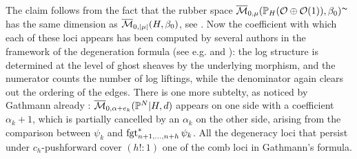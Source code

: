 \begin{rmk}
 \begin{center}
\end{center}
 
 The claim follows from the fact that the rubber space $\overline{\mathcal{M}}_{0,\mu}(\mathbb P_H(\mathcal{O}\oplus\mathcal{O}(1)),\beta_0)^\thicksim$ has the same dimension as $\overline{\mathcal{M}}_{0,\lvert\mu\rvert}(H,\beta_0)$, see \cite[\S 2.4]{GraberVakil}. Now the coefficient with which each of these loci appears has been computed by several authors in the framework of the degeneration formula (see e.g. \cite[Remark 6.3.1.2]{KimLog} and \cite[Equation (1.7)]{KLR}):  the log structure is determined at the level of ghost sheaves by the underlying morphism, and the numerator counts the number of log liftings, while the denominator again clears out the ordering of the edges. There is one more subtelty, as noticed by Gathmann already \cite[Corollary 3.5]{Ga}: $\overline{\mathcal{M}}_{0,\alpha+e_k}(\mathbb P^N|H,d)$ appears on one side with a coefficient $\alpha_k+1$, which is partially cancelled by an $\alpha_k$ on the other side, arising from the comparison between $\psi_k$ and $\operatorname{fgt}_{n+1,\ldots,n+h}^*\psi_k$. All the degeneracy loci that persist under $c_h$-pushforward cover $(h!:1)$ one of the comb loci in Gathmann's formula.
\end{rmk}

